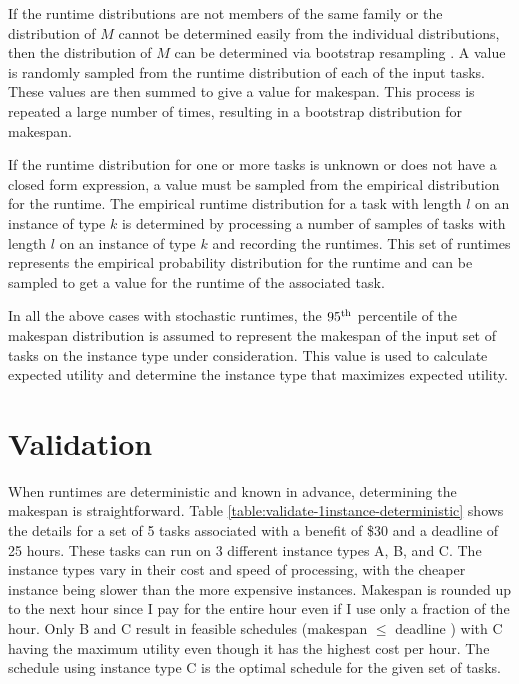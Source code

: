 \documentclass[12pt]{report}
\begin{document}
If the runtime distributions are not members of the same family or the distribution of $M$ cannot be determined easily from the individual distributions, then the distribution of $M$ can be determined via bootstrap resampling \cite{Efron1993}.
A value is randomly sampled from the runtime distribution of each of the input tasks.
These values are then summed to give a value for makespan.
This process is repeated a large number of times, resulting in a bootstrap distribution for makespan.

If the runtime distribution for one or more tasks is unknown or does not have a closed form expression, a value must be sampled from the empirical distribution for the runtime.
The empirical runtime distribution for a task with length $l$ on an instance of type $k$ is determined by processing a number of samples of tasks with length $l$ on an instance of type $k$ and recording the runtimes.
This set of runtimes represents the empirical probability distribution for the runtime and can be sampled to get a value for the runtime of the associated task.

In all the above cases with stochastic runtimes, the $95\textsuperscript{th}$ percentile of the makespan distribution is assumed to represent the makespan of the input set of tasks on the instance type under consideration.
This value is used to calculate expected utility and determine the instance type that maximizes expected utility.

\section{Validation}

\label{validate:runtimes:deterministic}
When runtimes are deterministic and known in advance, determining the makespan is straightforward. 
Table \ref{table:validate-1instance-deterministic} shows the details for a set of 5 tasks associated with a benefit of \$30 and a deadline of 25 hours. 
These tasks can run on 3 different instance types A, B, and C. 
The instance types vary in their cost and speed of processing, with the cheaper instance being slower than the more expensive instances. 
Makespan is rounded up to the next hour since I pay for the entire hour even if I use only a fraction of the hour. 
Only B and C result in feasible schedules (makespan $\leq$ deadline ) with C having the maximum utility even though it has the highest cost per hour.
The schedule using instance type C is the optimal schedule for the given set of tasks.
\end{document}
